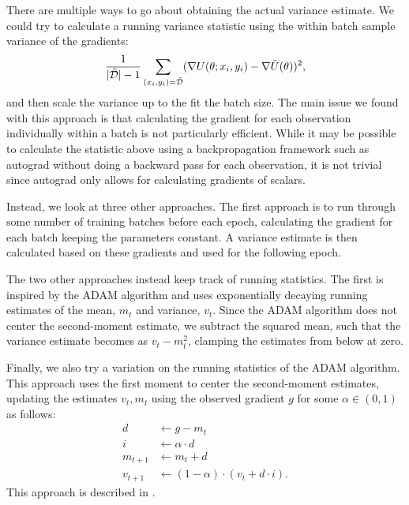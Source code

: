 There are multiple ways to go about obtaining the actual variance estimate.
We could try to calculate a running variance statistic using the within batch sample variance of the gradients:
\begin{equation}
    \frac{1}{|\tilde{\mathcal{D}}|-1}\sum_{(x_i,y_i)=\tilde{\mathcal{D}}} (\nabla U(\theta; x_i, y_i) - \nabla \bar{U}(\theta))^2,
\end{equation}
and then scale the variance up to the fit the batch size. 
The main issue we found with this approach is that calculating the gradient for each observation individually within a batch is not particularly efficient.
While it may be possible to calculate the statistic above using a backpropagation framework such as autograd without doing a backward pass for each observation, it is not trivial since autograd only allows for calculating gradients of scalars. 

Instead, we look at three other approaches. 
The first approach is to run through some number of training batches before each epoch, calculating the gradient for each batch keeping the parameters constant. 
A variance estimate is then calculated based on these gradients and used for the following epoch.

The two other approaches instead keep track of running statistics. 
The first is inspired by the ADAM algorithm \autocite{kingma_adam_2017} and uses exponentially decaying running estimates of the mean, $m_t$ and variance, $v_t$.  
Since the ADAM algorithm does not center the second-moment estimate, we subtract the squared mean, such that the variance estimate becomes as $v_t - m_t^2$, clamping the estimates from below at zero.

Finally, we also try a variation on the running statistics of the ADAM algorithm.
This approach uses the first moment to center the second-moment estimates, updating the estimates $v_t,m_t$ using the observed gradient $g$  for some $\alpha\in(0,1)$ as follows:
\begin{align}
    d &\gets g - m_t \\
    i &\gets \alpha \cdot d \\
    m_{t+1} &\gets m_t + d \\
    v_{t+1} &\gets (1 - \alpha)\cdot  (v_t +  d\cdot i).
\end{align}
This approach is described in \autocite{finch_incremental_nodate}.

